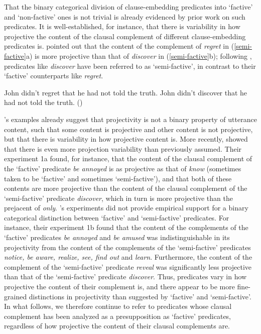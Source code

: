 \documentclass[11pt,fleqn]{article}
\newcommand{\6}{\mbox{$[\hspace*{-.6mm}[$}}
\newcommand{\9}{\mbox{$]\hspace*{-.6mm}]$}}
\newcommand{\citepos}[1]{\citeauthor{#1}'s \citeyear{#1}}
\begin{document}
That the binary categorical division of clause-embedding predicates into `factive' and `non-factive' ones is not trivial is already evidenced by prior work on such predicates. It is well-established, for instance, that there is variability in how projective the content of the clausal complement of different clause-embedding predicates is.  \citet{karttunen71b} pointed out that the content of the complement of {\em regret} in (\ref{semi-factive}a) is more projective than that of {\em discover} in (\ref{semi-factive}b); following \citealt{karttunen71b}, predicates like {\em discover} have been referred to as `semi-factive', in contrast to their `factive' counterparts like {\em regret}.


\begin{exe}
\ex\label{semi-factive}
\begin{xlist}
\ex John didn't regret that he had not told the truth.
\ex John didn't discover that he had not told the truth.  
\hfill (\citealt[63]{karttunen71b})

\end{xlist}
\end{exe}

\citepos{karttunen71b} examples already suggest that projectivity is not a binary property of utterance content, such that some content is projective and other content is not projective, but that there is variability in how projective content is. More recently, \citealt{tbd-variability} showed that there is even more projection variability than previously assumed. Their experiment 1a found, for instance, that the content of the clausal complement of the `factive' predicate {\em be annoyed} is as projective as that of {\em know} (sometimes taken to be `factive' and sometimes `semi-factive'), and that both of these contents are more projective than the content of the clausal complement of the `semi-factive' predicate {\em discover}, which in turn is more projective than the prejacent of {\em only}. \citepos{tbd-variability} experiments did not provide empirical support for a binary categorical distinction between `factive' and `semi-factive' predicates. For instance, their experiment 1b found that the content of the complements of the `factive' predicates {\em be annoyed} and {\em be amused} was indistinguishable in its projectivity from the content of the complements of the `semi-factive' predicates {\em notice, be aware, realize, see, find out} and {\em learn}. Furthermore, the content of the complement of the `semi-factive' predicate {\em reveal} was significantly less projective than that of the `semi-factive' predicate {\em discover}. Thus, predicates vary in how projective the content of their complement is, and there appear to be more fine-grained distinctions in projectivity than suggested by `factive' and `semi-factive'. In what follows, we therefore continue to refer to predicates whose clausal complement has been analyzed as a presupposition as `factive' predicates, regardless of how projective the content of their clausal complements are.
\end{document}
